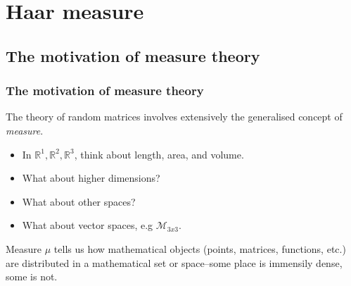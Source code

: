 \documentclass{beamer}
\begin{document}
\section{Haar measure}
\subsection{The motivation of measure theory}
\begin{frame}
  \frametitle{The motivation of measure theory}
  The theory of random matrices involves extensively the generalised concept of \textit{measure}. 
  \begin{itemize}
    \item In $\mathbb{R}^1, \mathbb{R}^2, \mathbb{R}^3$, think about length, area, and volume.
    \item What about higher dimensions?
    \item What about other spaces?
    \item What about vector spaces, e.g $\mathcal{M}_{3x3}$.
  \end{itemize}
  \begin{definition}
    Measure $\mu$ tells us how mathematical objects (points, matrices, functions, etc.) are distributed in a mathematical set or space--some place is immensily dense, some is not. 
  \end{definition}  
\end{frame}
\end{document}
